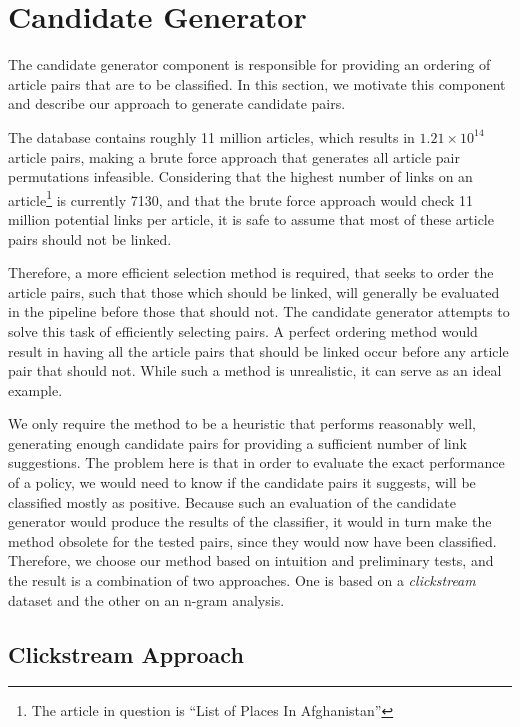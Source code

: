 \section{Candidate Generator}
The candidate generator component is responsible for providing an ordering of article pairs that are to be classified. In this section, we motivate this component and describe our approach to generate candidate pairs.

The database contains roughly 11 million articles, which results in $1.21 \times 10^{14}$ article pairs, making a brute force approach that generates all article pair permutations infeasible. Considering that the highest number of links on an article\footnote{The article in question is \enquote{List of Places In Afghanistan}} is currently 7130, and that the brute force approach would check 11 million potential links per article, it is safe to assume that most of these article pairs should not be linked.

Therefore, a more efficient selection method is required, that seeks to order the article pairs, such that those which should be linked, will generally be evaluated in the pipeline before those that should not. The candidate generator attempts to solve this task of efficiently selecting pairs. A perfect ordering method would result in having all the article pairs that should be linked occur before any article pair that should not. While such a method is unrealistic, it can serve as an ideal example.

We only require the method to be a heuristic that performs reasonably well, generating enough candidate pairs for providing a sufficient number of link suggestions. The problem here is that in order to evaluate the exact performance of a policy, we would need to know if the candidate pairs it suggests, will be classified mostly as positive. Because such an evaluation of the candidate generator would produce the results of the classifier, it would in turn make the method obsolete for the tested pairs, since they would now have been classified.  Therefore, we choose our method based on intuition and preliminary tests, and the result is a combination of two approaches. One is based on a \emph{clickstream} dataset and the other on an n-gram analysis.

\subsection{Clickstream Approach}\label{sec:candidate_clickstream}

